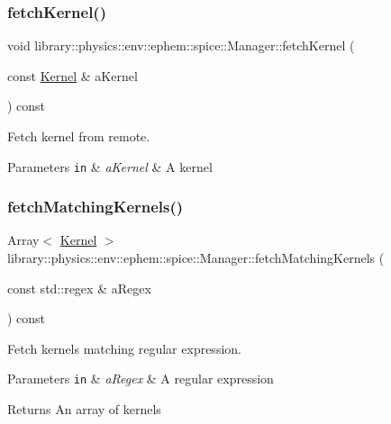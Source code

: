 \subsubsection{\texorpdfstring{fetch\+Kernel()}{fetchKernel()}}
{\footnotesize\ttfamily void library\+::physics\+::env\+::ephem\+::spice\+::\+Manager\+::fetch\+Kernel (\begin{DoxyParamCaption}\item[{const \hyperlink{classlibrary_1_1physics_1_1env_1_1ephem_1_1spice_1_1_kernel}{Kernel} \&}]{a\+Kernel }\end{DoxyParamCaption}) const}



Fetch kernel from remote. 


\begin{DoxyParams}[1]{Parameters}
\mbox{\tt in}  & {\em a\+Kernel} & A kernel \\
\hline
\end{DoxyParams}
\mbox{\label{classlibrary_1_1physics_1_1env_1_1ephem_1_1spice_1_1_manager_ac6f9fa45224f6f1116e66ae2c32e3e65}} 
\subsubsection{\texorpdfstring{fetch\+Matching\+Kernels()}{fetchMatchingKernels()}}
{\footnotesize\ttfamily Array$<$ \hyperlink{classlibrary_1_1physics_1_1env_1_1ephem_1_1spice_1_1_kernel}{Kernel} $>$ library\+::physics\+::env\+::ephem\+::spice\+::\+Manager\+::fetch\+Matching\+Kernels (\begin{DoxyParamCaption}\item[{const std\+::regex \&}]{a\+Regex }\end{DoxyParamCaption}) const}



Fetch kernels matching regular expression. 


\begin{DoxyParams}[1]{Parameters}
\mbox{\tt in}  & {\em a\+Regex} & A regular expression \\
\hline
\end{DoxyParams}
\begin{DoxyReturn}{Returns}
An array of kernels 
\end{DoxyReturn}
\mbox{\label{classlibrary_1_1physics_1_1env_1_1ephem_1_1spice_1_1_manager_a3555b4555090b1140f1041d7e51ad640}} 
